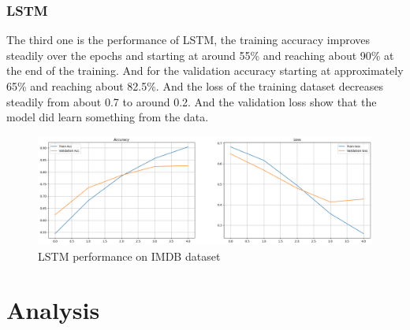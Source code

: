 \documentclass[12pt,a4paper]{article}
\begin{document}
\subsubsection{LSTM}
The third one is the performance of LSTM, the training accuracy improves steadily over the epochs and starting at around 55\% and reaching about 90\% at the end of the training. And for the validation accuracy starting at approximately 65\% and reaching about 82.5\%. And the loss of the training dataset decreases steadily from about 0.7 to around 0.2. And the validation loss show that the model did learn something from the data. 
\begin{figure}[h!]
    \centering
    \includegraphics[width=1\textwidth]{../Pic/lstm_performance.png}
    \caption{LSTM performance on IMDB dataset}
\end{figure}

\newpage
\section{Analysis}
\end{document}
